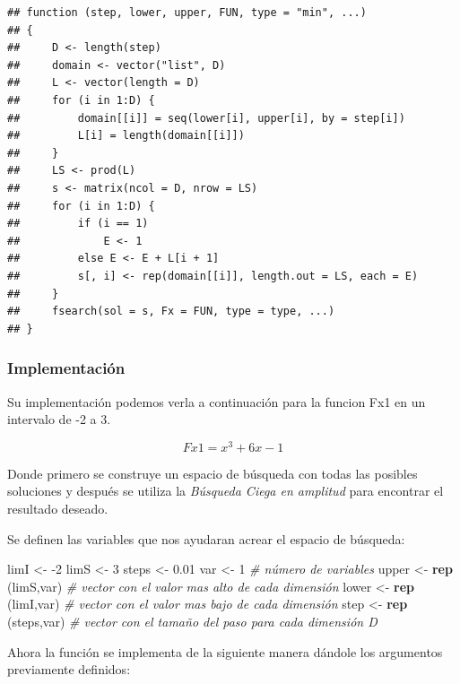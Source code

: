 \documentclass[11pt,]{article}
\newenvironment{Shaded}{\begin{snugshade}}{\end{snugshade}}
\newcommand{\CommentTok}[1]{\textcolor[rgb]{0.56,0.35,0.01}{\textit{#1}}}
\newcommand{\DecValTok}[1]{\textcolor[rgb]{0.00,0.00,0.81}{#1}}
\newcommand{\FloatTok}[1]{\textcolor[rgb]{0.00,0.00,0.81}{#1}}
\newcommand{\KeywordTok}[1]{\textcolor[rgb]{0.13,0.29,0.53}{\textbf{#1}}}
\newcommand{\NormalTok}[1]{#1}
\newcommand{\StringTok}[1]{\textcolor[rgb]{0.31,0.60,0.02}{#1}}
\begin{document}
\begin{verbatim}
## function (step, lower, upper, FUN, type = "min", ...) 
## {
##     D <- length(step)
##     domain <- vector("list", D)
##     L <- vector(length = D)
##     for (i in 1:D) {
##         domain[[i]] = seq(lower[i], upper[i], by = step[i])
##         L[i] = length(domain[[i]])
##     }
##     LS <- prod(L)
##     s <- matrix(ncol = D, nrow = LS)
##     for (i in 1:D) {
##         if (i == 1) 
##             E <- 1
##         else E <- E + L[i + 1]
##         s[, i] <- rep(domain[[i]], length.out = LS, each = E)
##     }
##     fsearch(sol = s, Fx = FUN, type = type, ...)
## }
\end{verbatim}

\hypertarget{implementaciuxf3n}{%
\subsubsection{Implementación}\label{implementaciuxf3n}}

Su implementación podemos verla a continuación para la funcion Fx1 en un
intervalo de -2 a 3.

\[Fx1= x^3 + 6x -1 \]

Donde primero se construye un espacio de búsqueda con todas las posibles
soluciones y después se utiliza la \emph{Búsqueda Ciega en amplitud}
para encontrar el resultado deseado.

Se definen las variables que nos ayudaran acrear el espacio de búsqueda:

\begin{Shaded}
\begin{Highlighting}[]
\NormalTok{limI <-}\StringTok{ }\DecValTok{-2}
\NormalTok{limS <-}\StringTok{ }\DecValTok{3}
\NormalTok{steps <-}\StringTok{ }\FloatTok{0.01}                   
\NormalTok{var <-}\StringTok{ }\DecValTok{1}                    \CommentTok{# número de variables}
\NormalTok{upper <-}\StringTok{ }\KeywordTok{rep}\NormalTok{ (limS,var)     }\CommentTok{# vector con el valor mas alto de cada dimensión}
\NormalTok{lower <-}\StringTok{ }\KeywordTok{rep}\NormalTok{ (limI,var)     }\CommentTok{# vector con el valor mas bajo de cada dimensión}
\NormalTok{step  <-}\StringTok{ }\KeywordTok{rep}\NormalTok{ (steps,var)    }\CommentTok{# vector con el tamaño del paso para cada dimensión D}
\end{Highlighting}
\end{Shaded}

Ahora la función se implementa de la siguiente manera dándole los
argumentos previamente definidos:
\end{document}
